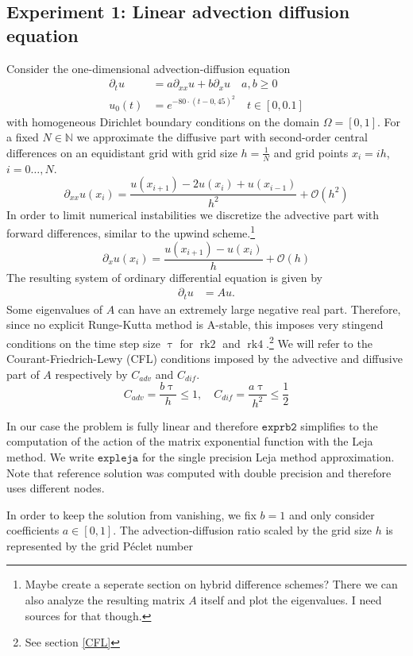 \documentclass{scrartcl}
\begin{document}
	\subsection{Experiment 1: Linear advection diffusion equation}
	Consider the one-dimensional advection-diffusion equation
	\begin{align*}
	\partial_tu &= a\partial_{xx}u + b\partial_xu \quad a,b\ge 0\\
	u_0(t) &= e^{-80\cdot(t-0,45)^2} \quad t\in[0,0.1]
	\end{align*}
	with homogeneous Dirichlet boundary conditions on the domain $\Omega = [0,1]$. 
	For a fixed $N\in\mathbb N$ we approximate the diffusive part with second-order central differences on an equidistant grid with grid size $h = \frac{1}{N}$ and grid points $x_i = ih$, $i=0\dots,N$.
	\[\partial_{xx}u(x_i) = \frac{u(x_{i+1}) - 2u(x_i) + u(x_{i-1})}{{h}^2} + \mathcal{O}({h}^2)\]
	In order to limit numerical instabilities we discretize the advective part with forward differences, similar to the upwind scheme.\footnote{Maybe create a seperate section on hybrid difference schemes? There we can also analyze the resulting matrix $A$ itself and plot the eigenvalues. I need sources for that though.}
	\[\partial_{x}u(x_i) = \frac{u(x_{i+1}) - u(x_i)}{h} + \mathcal{O}(h)\]
	The resulting system of ordinary differential equation is given by
	\begin{align*}
	\partial_tu &= Au.
	\end{align*} 
	Some eigenvalues of $A$ can have an extremely large negative real part. Therefore, since no explicit Runge-Kutta method is A-stable, this imposes very stingend conditions on the time step size $\uptau$ for $\operatorname{rk2}$ and $\operatorname{rk4}$.\footnote{See section \ref{CFL}} We will refer to the Courant-Friedrich-Lewy (CFL) conditions imposed by the advective and diffusive part of $A$ respectively by $C_{adv}$ and $C_{dif}$.  
	\[ C_{adv} = \frac{b\uptau}{h} \le 1, \quad C_{dif} = \frac{a\uptau}{h^2} \le \frac{1}{2}\] 
	
	
	
	In our case the problem is fully linear and therefore $\texttt{exprb2}$ simplifies to the computation of the action of the matrix exponential function with the Leja method. We write $\texttt{expleja}$ for the single precision Leja method approximation. Note that reference solution was computed with double precision and therefore uses different nodes.
	
	In order to keep the solution from vanishing, we fix $b = 1$ and only consider coefficients $a\in[0,1]$. The advection-diffusion ratio scaled by the grid size $h$ is represented by the grid P\'eclet number
	
\end{document}
